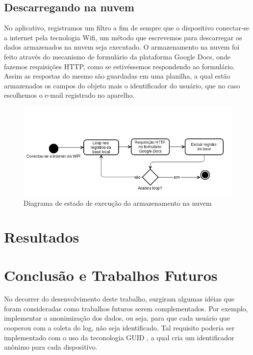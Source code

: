 \documentclass[12pt, %
openright, 
oneside, %
a4paper,    %
brazil]{facom-ufu-abntex2}
\begin{document}
\section{Descarregando na nuvem}
No aplicativo, registramos um filtro a fim de sempre que o dispositivo conectar-se a internet pela tecnologia Wifi, um método que escrevemos para descarregar os dados armazenados na nuvem seja executado.
O armazenamento na nuvem foi feito através do mecanismo de formulário da plataforma Google Docs, onde fazemos requisições HTTP, como se estivéssemos respondendo ao formulário. Assim as respostas do mesmo são guardadas em uma planilha, a qual estão armazenados os campos do objeto mais o identificador do usuário, que no caso escolhemos o e-mail registrado no aparelho.
\begin{figure}[!htb]
    \centering
    \includegraphics[scale=0.45,natwidth=610,natheight=64]{pherocast3.png}
    \caption{Diagrama de estado de execução do armazenamento na nuvem}
    \label{figRotulo}
  \end{figure}
\chapter{Resultados}
\chapter*[Conclusão]{Conclusão e Trabalhos Futuros}

No decorrer do desenvolvimento deste trabalho, surgiram algumas idéias que foram consideradas como trabalhos futuros serem complementados. Por exemplo, implementar a anonimização dos dados, ou seja, para que cada usuário que cooperou com a coleta do log, não seja identificado. Tal requisito poderia ser implementado com o uso da teconologia GUID , a qual cria um identificador anônimo para cada dispositivo.
\end{document}
